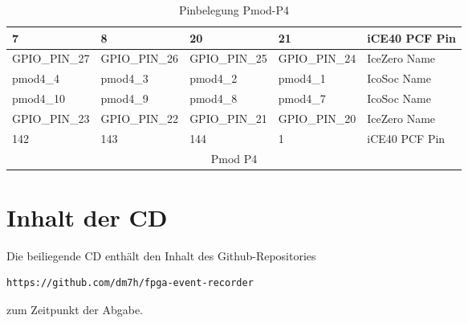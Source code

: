 \begin{table}[H]
\centering
\caption{Pinbelegung Pmod-P4}
\label{tbl:pmod4}
\begin{tabular}{|l|l|l|l|l|}
\hline
\cellcolor[HTML]{EFEFEF}7         & \cellcolor[HTML]{EFEFEF}8        & \cellcolor[HTML]{EFEFEF}20       & \cellcolor[HTML]{EFEFEF}21       & iCE40 PCF Pin      \\ \hline
GPIO\_PIN\_27                     & GPIO\_PIN\_26                    & GPIO\_PIN\_25                    & GPIO\_PIN\_24                    & IceZero Name \\ \hline
\cellcolor[HTML]{C0C0C0}pmod4\_4  & \cellcolor[HTML]{C0C0C0}pmod4\_3 & \cellcolor[HTML]{C0C0C0}pmod4\_2 & \cellcolor[HTML]{C0C0C0}pmod4\_1 & IcoSoc Name  \\ \hline
\cellcolor[HTML]{C0C0C0}pmod4\_10 & \cellcolor[HTML]{C0C0C0}pmod4\_9 & \cellcolor[HTML]{C0C0C0}pmod4\_8 & \cellcolor[HTML]{C0C0C0}pmod4\_7 & IcoSoc Name  \\ \hline
GPIO\_PIN\_23                     & GPIO\_PIN\_22                    & GPIO\_PIN\_21                    & GPIO\_PIN\_20                    & IceZero Name \\ \hline
\cellcolor[HTML]{EFEFEF}142       & \cellcolor[HTML]{EFEFEF}143      & \cellcolor[HTML]{EFEFEF}144      & \cellcolor[HTML]{EFEFEF}1        & iCE40 PCF Pin      \\ \hline
\multicolumn{5}{|c|}{Pmod P4}                                                                                                                             \\ \hline
\end{tabular}
\end{table}

\clearpage

\section{Inhalt der CD}
Die beiliegende CD enthält den Inhalt des Github-Repositories 
\begin{lstlisting}[language=bash]
https://github.com/dm7h/fpga-event-recorder
\end{lstlisting}
zum Zeitpunkt der Abgabe.


